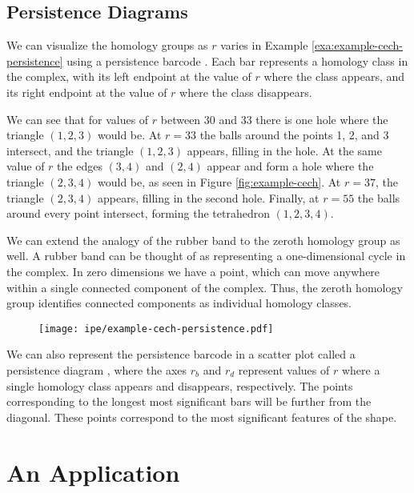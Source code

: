 \subsection{Persistence Diagrams}

We can visualize the homology groups as \(r\) varies in Example \ref{exa:example-cech-persistence} using a persistence barcode .
Each bar represents a homology class in the complex, with its left endpoint at the value of \(r\) where the class appears, and its right endpoint at the value of \(r\) where the class disappears.

We can see that for values of \(r\) between 30 and 33 there is one hole where the triangle \((1,2,3)\) would be.
At \(r=33\) the balls around the points 1, 2, and 3 intersect, and the triangle \((1,2,3)\) appears, filling in the hole.
At the same value of \(r\) the edges \((3,4)\) and \((2,4)\) appear and form a hole where the triangle \((2,3,4)\) would be, as seen in Figure \ref{fig:example-cech}.
At \(r=37\), the triangle \((2,3,4)\) appears, filling in the second hole.
Finally, at \(r=55\) the balls around every point intersect, forming the tetrahedron \((1,2,3,4)\).

We can extend the analogy of the rubber band to the zeroth homology group as well.
A rubber band can be thought of as representing a one-dimensional cycle in the complex.
In zero dimensions we have a point, which can move anywhere within a single connected component of the complex.
Thus, the zeroth homology group identifies connected components as individual homology classes.

\begin{figure}
    \centering
    \texttt{[image: ipe/example-cech-persistence.pdf]}
    \caption{}
    \label{fig:example-cech-persistence}
\end{figure}

We can also represent the persistence barcode in a scatter plot called a persistence diagram , where the axes \(r_b\) and \(r_d\) represent values of \(r\) where a single homology class appears and disappears, respectively.
The points corresponding to the longest most significant bars will be further from the diagonal. These points correspond to the most significant features of the shape.

\section{An Application}\label{sec:application}

